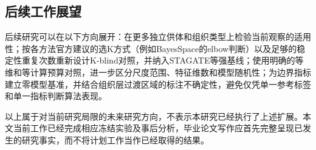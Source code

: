 \subsection{后续工作展望}
后续研究可以在以下方向展开：在更多独立供体和组织类型上检验当前观察的适用性；按各方法官方建议的选K方式（例如BayesSpace的elbow判断）以及足够的稳定性重复次数重新设计K-blind对照，并纳入STAGATE等强基线；使用明确的等维和等计算预算对照，进一步区分尺度范围、特征维数和模型随机性；为边界指标建立零模型基准，并结合组织层过渡区域的标注不确定性，避免仅凭单一参考标签和单一指标判断算法表现。

以上属于对当前研究局限的未来研究方向，不表示本研究已经执行了上述扩展。本文当前工作已经完成相应冻结实验及事后分析，毕业论文写作应首先完整呈现已发生的研究事实，而不将计划工作当作已经取得的结果。
